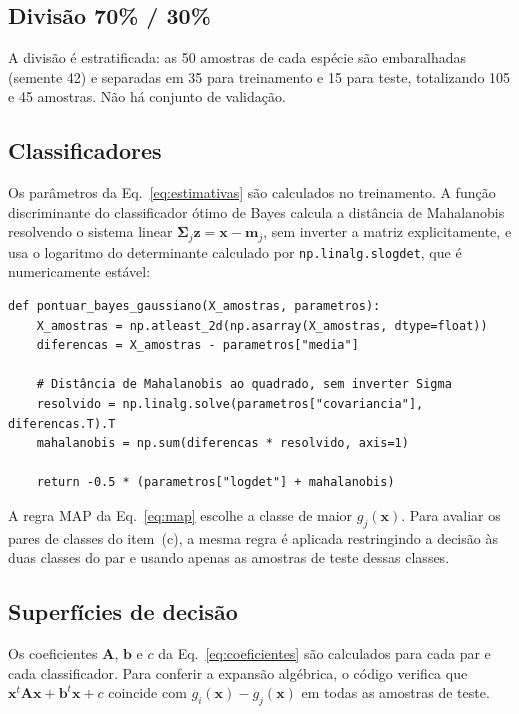 \documentclass[12pt,a4paper]{article}
\begin{document}
\subsection{Divisão 70\% / 30\%}

A divisão é estratificada: as 50 amostras de cada espécie são embaralhadas (semente 42) e separadas em 35 para treinamento e 15 para teste, totalizando 105 e 45 amostras. Não há conjunto de validação.

\subsection{Classificadores}

Os parâmetros da Eq.~\eqref{eq:estimativas} são calculados no treinamento. A função discriminante do classificador ótimo de Bayes calcula a distância de Mahalanobis resolvendo o sistema linear $\boldsymbol{\Sigma}_j\mathbf{z} = \mathbf{x} - \mathbf{m}_j$, sem inverter a matriz explicitamente, e usa o logaritmo do determinante calculado por \texttt{np.linalg.slogdet}, que é numericamente estável:

\begin{lstlisting}[title=\texttt{bayes.py} --- função discriminante do classificador ótimo de Bayes]
def pontuar_bayes_gaussiano(X_amostras, parametros):
    X_amostras = np.atleast_2d(np.asarray(X_amostras, dtype=float))
    diferencas = X_amostras - parametros["media"]

    # Distância de Mahalanobis ao quadrado, sem inverter Sigma
    resolvido = np.linalg.solve(parametros["covariancia"], diferencas.T).T
    mahalanobis = np.sum(diferencas * resolvido, axis=1)

    return -0.5 * (parametros["logdet"] + mahalanobis)
\end{lstlisting}

A regra MAP da Eq.~\eqref{eq:map} escolhe a classe de maior $g_j(\mathbf{x})$. Para avaliar os pares de classes do item~(c), a mesma regra é aplicada restringindo a decisão às duas classes do par e usando apenas as amostras de teste dessas classes.

\subsection{Superfícies de decisão}

Os coeficientes $\mathbf{A}$, $\mathbf{b}$ e $c$ da Eq.~\eqref{eq:coeficientes} são calculados para cada par e cada classificador. Para conferir a expansão algébrica, o código verifica que $\mathbf{x}^t\mathbf{A}\mathbf{x} + \mathbf{b}^t\mathbf{x} + c$ coincide com $g_i(\mathbf{x}) - g_j(\mathbf{x})$ em todas as amostras de teste.
\end{document}
